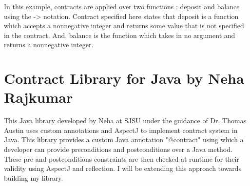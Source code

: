 In this example, contracts are applied over two functions : deposit and balance using the -> notation. Contract specified here states that deposit is a function which accepts a nonnegative integer and returns some value that is not specified in the contract. And, balance is the function which takes in no argument and returns a nonnegative integer.

\section{Contract Library for Java by Neha Rajkumar}
This Java library \cite{rajkumar2015designing} developed by Neha at SJSU under the guidance of Dr. Thomas Austin uses custom annotations and AspectJ to implement contract system in Java. This library provides a custom Java annotation "@contract" using which a developer can provide preconditions and postconditions over a Java method. These pre and postconditions constraints are then checked at runtime for their validity using AspectJ and reflection. I will be extending this approach towards building my library.   	     